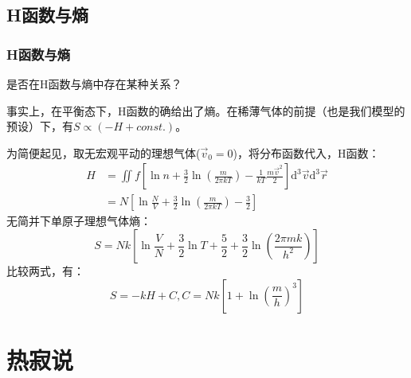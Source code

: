\documentclass{if-beamer}
\begin{document}
\subsection{H函数与熵}
\begin{frame}
    \frametitle{H函数与熵}
        是否在H函数与熵中存在某种关系？
        
        
    \begin{block}{}
        事实上，在平衡态下，H函数的确给出了熵。在稀薄气体的前提（也是我们模型的预设）下，有$S\propto(-H+const.)$。 
                                                                                                                                                                                                                                                                                 
    \end{block}
    \begin{block}{}
        为简便起见，取无宏观平动的理想气体($\vec{v}_0=0$)，将分布函数代入，H函数：
        \begin{equation*}
            \begin{aligned}
                H&=\iint f\left[\ln n+\frac{3}{2} \ln \left(\frac{m}{2 \pi k T}\right)-\frac{1}{k T} \frac{m \vec{v}^{2}}{2}\right] \mathrm{d}^{3} \vec{v} \mathrm{d}^{3} \vec{r}\\
                &=N\left[\ln \frac{N}{V}+\frac{3}{2} \ln \left(\frac{m}{2 \pi k T}\right)-\frac{3}{2}\right]
            \end{aligned}
        \end{equation*}
        无简并下单原子理想气体熵：
        \begin{equation*}
            S=N k\left[\ln \frac{V}{N}+\frac{3}{2} \ln T+\frac{5}{2}+\frac{3}{2} \ln \left(\frac{2 \pi m k}{h^{2}}\right)\right]
        \end{equation*}
        比较两式，有：
        \begin{equation*}
            S=-k H+C,C=N k\left[1+\ln \left(\frac{m}{h}\right)^{3}\right]
        \end{equation*}

            
        

    \end{block}


        
    

\end{frame}
\section{热寂说}
\end{document}
